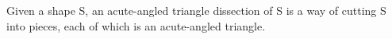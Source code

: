 Given a shape S, an acute-angled triangle dissection
of S is a way of cutting S into pieces, each of which
is an acute-angled triangle.